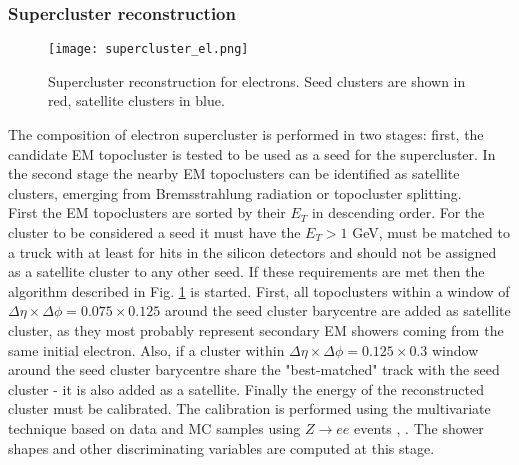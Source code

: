  	\subsubsection{Supercluster reconstruction}
 	\begin{figure}[htbp]
 		\centering
 		\texttt{[image: supercluster\_el.png]}
 		\caption[Supercluster]{Supercluster reconstruction for electrons. Seed clusters are shown in red, satellite clusters in blue.}
 		\label{fig::supercluster}
 	\end{figure}
 	The composition of electron supercluster is performed in two stages: first, the candidate EM topocluster is tested to be used as a seed for the supercluster. In the second stage the nearby EM topoclusters can be identified as satellite clusters, emerging from Bremsstrahlung radiation or topocluster splitting.\\
 	First the EM topoclusters are sorted by their $E_T$ in descending order. For the cluster to be considered a seed it must have the $E_T>1$ GeV, must be matched to a truck with at least for hits in the silicon detectors and should not be assigned as a satellite cluster to any other seed. If these requirements are met then the algorithm described in Fig. \ref{fig::supercluster} is started. First, all topoclusters within a window of  $\Delta \eta \times \Delta \phi = 0.075 \times 0.125$ around the seed cluster barycentre are added as satellite cluster, as they most probably represent secondary EM showers coming from the same initial electron. Also, if a cluster within $\Delta \eta \times \Delta \phi = 0.125 \times 0.3$ window around the seed cluster barycentre share the "best-matched" track with the seed cluster - it is also added as a satellite.
  	Finally the energy of the reconstructed cluster must be calibrated. The calibration is performed using the multivariate technique based on data and MC samples using $Z \rightarrow ee$ events \cite{Aaboud:2018ugz}, \cite {Aaboud:2018yqu}. The shower shapes and other discriminating variables are computed at this stage.
